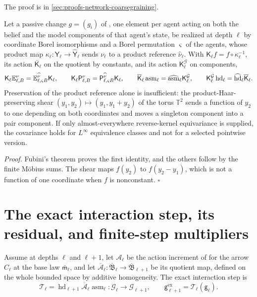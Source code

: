 The proof is in \cref{sec:proofs-network-coarsegraining}.

Let a passive change $g=(g_i)$ of , one element per agent acting
on both the belief and the model components of that agent's state, be realized at
depth $\ell$ by coordinate Borel isomorphisms and a Borel permutation $\varsigma$ of
the agents, whose product map $\kappa_\ell:\mathsf Y_\ell\to\widehat{\mathsf
Y}_\ell$ sends $\nu_\ell$ to a product reference $\widehat\nu_\ell$. With
$\mathsf K_\ell f=f\circ\kappa_\ell^{-1}$, its action $\overline{\mathsf K}_\ell$
on the quotient by constants, and its action $\mathsf K^{\mathcal G}_\ell$ on
components,
\begin{equation}
\mathsf K_\ell\mathbb E^{\nu}_{\ell,B}=\mathbb E^{\widehat\nu}_{\ell,\varsigma B}\mathsf K_\ell,
\qquad
\mathsf K_\ell\mathsf P^{\nu}_{\ell,B}=\mathsf P^{\widehat\nu}_{\ell,\varsigma B}\mathsf K_\ell,
\qquad
\overline{\mathsf K}_\ell\operatorname{asm}_\ell
=\widehat{\operatorname{asm}}_\ell\mathsf K^{\mathcal G}_\ell,
\qquad
\mathsf K^{\mathcal G}_\ell\operatorname{hd}_\ell
=\widehat{\operatorname{hd}}_\ell\overline{\mathsf K}_\ell.
\label{eq:rg-hoeffding-gauge-covariance}
\end{equation}
Preservation of the product reference alone is insufficient: the
product-Haar-preserving shear $(y_1,y_2)\mapsto(y_1,y_1+y_2)$ of the torus
$\mathbb T^2$ sends a function of $y_2$ to one depending on both coordinates and
moves a singleton component into a pair component. If only almost-everywhere
reverse-kernel equivariance is supplied, the covariance holds for $L^\infty$
equivalence classes and not for a selected pointwise version.

\noindent\emph{Proof.}
Fubini's theorem proves the first identity, and the others follow by the finite
M\"obius sums. The shear maps $f(y_2)$ to $f(y_2-y_1)$, which is not a function of
one coordinate when $f$ is nonconstant. $\square$

\section{The exact interaction step, its residual, and finite-step multipliers}
\label{sec:rg-exact-nonlinear-interaction-rg}

Assume  at depths $\ell$ and $\ell+1$, let
$\mathcal A_\ell$ be the action increment of 
for the arrow $C_\ell$ at the base law $\bar{\mathsf m}_\ell$, and let
$\overline{\mathcal A}_\ell:\overline{\mathfrak B}_\ell\to\overline{\mathfrak
B}_{\ell+1}$ be its quotient map, defined on the whole bounded space by additive
homogeneity. The exact interaction step is
\begin{equation}
\mathcal T_\ell=\operatorname{hd}_{\ell+1}\overline{\mathcal A}_\ell\operatorname{asm}_\ell:
\mathcal G_\ell\longrightarrow\mathcal G_{\ell+1},
\qquad
\mathsf g^{\mathrm{ex}}_{\ell+1}=\mathcal T_\ell(\mathsf g_\ell).
\label{eq:rg-exact-nonlinear-interaction-map}
\end{equation}

